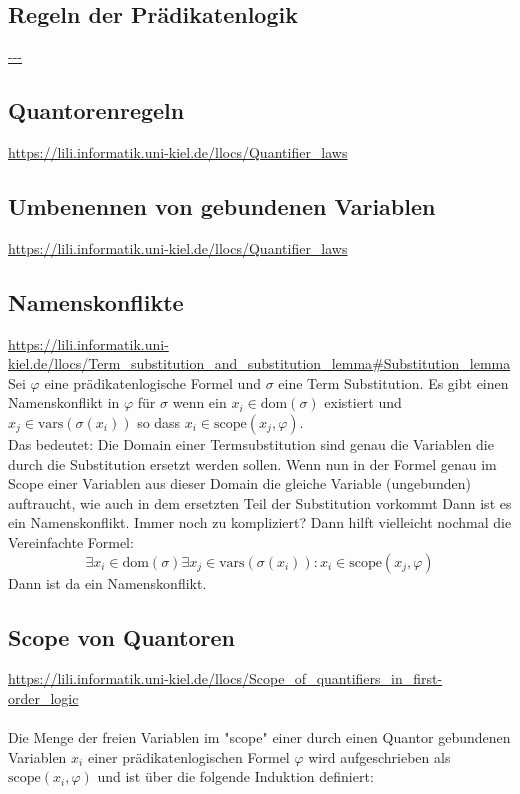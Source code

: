 \documentclass[twocolumn]{article}
\begin{document}
    \subsection{Regeln der Prädikatenlogik}
    \url{---}\\

    \subsection{Quantorenregeln}
    \url{https://lili.informatik.uni-kiel.de/llocs/Quantifier_laws}\\

    \subsection{Umbenennen von gebundenen Variablen}
    \url{https://lili.informatik.uni-kiel.de/llocs/Quantifier_laws}\\
    
    \subsection{Namenskonflikte}
    \url{https://lili.informatik.uni-kiel.de/llocs/Term_substitution_and_substitution_lemma#Substitution_lemma}\\
    Sei $\varphi$ eine prädikatenlogische Formel und  $\sigma$ eine Term Substitution. Es gibt einen Namenskonflikt in $\varphi$ für $\sigma$ wenn ein $x_i \in \text{dom}(\sigma)$ existiert und $x_j \in \text{vars}(\sigma(x_i))$ so dass $x_i \in \text{scope}(x_j, \varphi)$.\\
    Das bedeutet: Die Domain einer Termsubstitution sind genau die Variablen die durch die Substitution ersetzt werden sollen. Wenn nun in der Formel genau im Scope einer Variablen aus dieser Domain die gleiche Variable (ungebunden) auftraucht, wie auch in dem ersetzten Teil der Substitution vorkommt Dann ist es ein Namenskonflikt. Immer noch zu kompliziert? Dann hilft vielleicht nochmal die Vereinfachte Formel:
    $$ \exists x_i \in \text{dom}(\sigma) \exists x_j \in \text{vars}(\sigma (x_i)): x_i \in \text{scope}(x_j,\varphi)$$
    Dann ist da ein Namenskonflikt.

    \subsection{Scope von Quantoren}
    \url{https://lili.informatik.uni-kiel.de/llocs/Scope_of_quantifiers_in_first-order_logic}\\\\
    Die Menge der freien Variablen im "scope" einer durch einen Quantor gebundenen Variablen $x_i$ einer prädikatenlogischen Formel $\varphi$ wird aufgeschrieben als $\text{scope}(x_i, \varphi)$ und ist über die folgende Induktion definiert:
\end{document}
